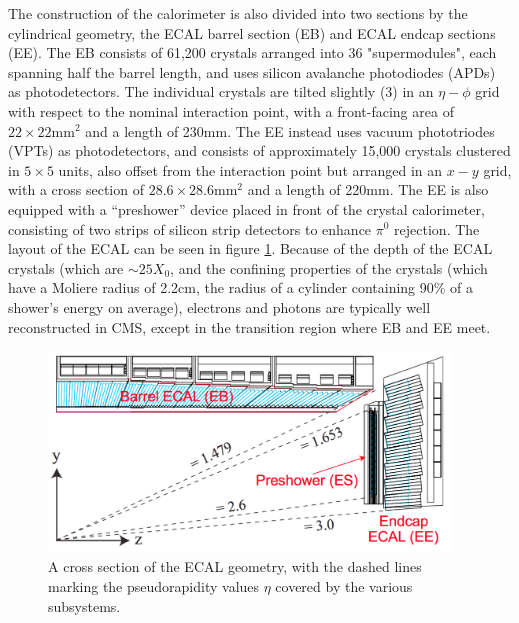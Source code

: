 The construction of the calorimeter is also divided into two sections by the cylindrical geometry, the ECAL barrel section (EB) and ECAL endcap sections (EE). The EB consists of 61,200 crystals arranged into 36 "supermodules", each spanning half the barrel length, and uses silicon avalanche photodiodes (APDs) as photodetectors. The individual crystals are tilted slightly (3\textdegree) in an $\eta-\phi$ grid with respect to the nominal interaction point, with a front-facing area of $22\times22\text{mm}^2$ and a length of 230mm. The EE instead uses vacuum phototriodes (VPTs) as photodetectors, and consists of approximately 15,000 crystals clustered in $5\times5$ units, also offset from the interaction point but arranged in an $x-y$ grid, with a cross section of $28.6\times28.6\text{mm}^2$ and a length of 220mm. The EE is also equipped with a ``preshower'' device placed in front of the crystal calorimeter, consisting of two strips of silicon strip detectors to enhance $\pi^0$ rejection. The layout of the ECAL can be seen in figure \ref{fig:ecalGeometry}. Because of the depth of the ECAL crystals (which are $\sim25X_0$, and the confining properties of the crystals (which have a Moliere radius of 2.2cm, the radius of a cylinder containing 90\% of a shower's energy on average), electrons and photons are typically well reconstructed in CMS, except in the transition region where EB and EE meet.
\begin{figure}
	\centering
	\includegraphics[width=0.95\textwidth]{detector/figs/ecalGeometry}
	\renewcommand{\baselinestretch}{1.0}
	\caption[A cross section of the ECAL geometry, with the dashed lines marking the pseudorapidity values $\eta$ covered by the various subsystems.]{A cross section of the ECAL geometry, with the dashed lines marking the pseudorapidity values $\eta$ covered by the various subsystems.}
	\label{fig:ecalGeometry}
\end{figure}

